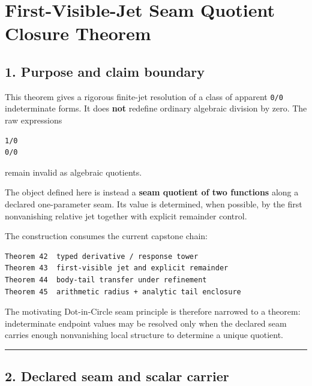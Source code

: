 \hypertarget{first-visible-jet-seam-quotient-closure-theorem}{%
\chapter{First-Visible-Jet Seam Quotient Closure Theorem}\label{first-visible-jet-seam-quotient-closure-theorem}}

\hypertarget{purpose-and-claim-boundary}{%
\section{1. Purpose and claim boundary}\label{purpose-and-claim-boundary}}

This theorem gives a rigorous finite-jet resolution of a class of apparent
\texttt{0/0} indeterminate forms. It does \textbf{not} redefine ordinary algebraic division
by zero. The raw expressions

\begin{verbatim}
1/0
0/0
\end{verbatim}

remain invalid as algebraic quotients.

The object defined here is instead a \textbf{seam quotient of two functions} along a
declared one-parameter seam. Its value is determined, when possible, by the
first nonvanishing relative jet together with explicit remainder control.

The construction consumes the current capstone chain:

\begin{verbatim}
Theorem 42  typed derivative / response tower
Theorem 43  first-visible jet and explicit remainder
Theorem 44  body-tail transfer under refinement
Theorem 45  arithmetic radius + analytic tail enclosure
\end{verbatim}

The motivating Dot-in-Circle seam principle is therefore narrowed to a theorem:
indeterminate endpoint values may be resolved only when the declared seam
carries enough nonvanishing local structure to determine a unique quotient.

\begin{center}\rule{0.5\linewidth}{0.5pt}\end{center}

\hypertarget{declared-seam-and-scalar-carrier}{%
\section{2. Declared seam and scalar carrier}\label{declared-seam-and-scalar-carrier}}

